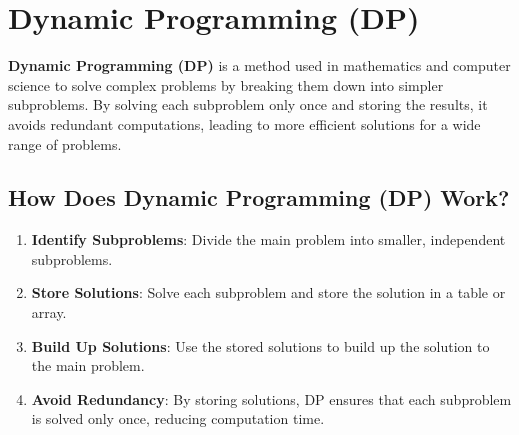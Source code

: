 \chapter{Dynamic Programming (DP) \cite{gfg-dynamic-programming}}

\textbf{Dynamic Programming (DP)} is a method used in mathematics and computer science to solve complex problems by breaking them down into simpler subproblems. By solving each subproblem only once and storing the results, it avoids redundant computations, leading to more efficient solutions for a wide range of problems.

\section{How Does Dynamic Programming (DP) Work?}

\begin{enumerate}
    \item \textbf{Identify Subproblems}: Divide the main problem into smaller, independent subproblems.
    \item \textbf{Store Solutions}: Solve each subproblem and store the solution in a table or array.
    \item \textbf{Build Up Solutions}: Use the stored solutions to build up the solution to the main problem.
    \item \textbf{Avoid Redundancy}: By storing solutions, DP ensures that each subproblem is solved only once, reducing computation time.
\end{enumerate}


